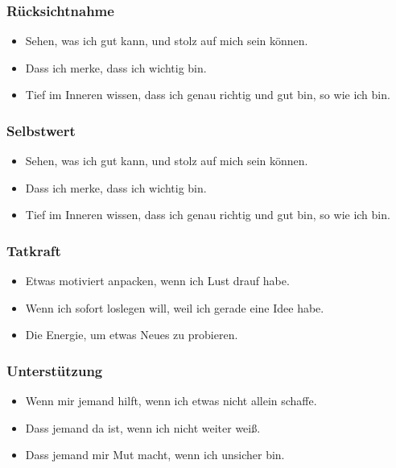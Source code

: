 \subsubsection{Rücksichtnahme}

\begin{itemize}
    \item Sehen, was ich gut kann, und stolz auf mich sein können.
    \item Dass ich merke, dass ich wichtig bin.
    \item Tief im Inneren wissen, dass ich genau richtig und gut bin, so wie ich bin.
\end{itemize}

\subsubsection{Selbstwert}

\begin{itemize}
    \item Sehen, was ich gut kann, und stolz auf mich sein können.
    \item Dass ich merke, dass ich wichtig bin.
    \item Tief im Inneren wissen, dass ich genau richtig und gut bin, so wie ich bin.
\end{itemize}

\subsubsection{Tatkraft}

\begin{itemize}
    \item Etwas motiviert anpacken, wenn ich Lust drauf habe.
    \item Wenn ich sofort loslegen will, weil ich gerade eine Idee habe.
    \item Die Energie, um etwas Neues zu probieren.
\end{itemize}

\subsubsection{Unterstützung}

\begin{itemize}
    \item Wenn mir jemand hilft, wenn ich etwas nicht allein schaffe.
    \item Dass jemand da ist, wenn ich nicht weiter weiß.
    \item Dass jemand mir Mut macht, wenn ich unsicher bin.
\end{itemize}

